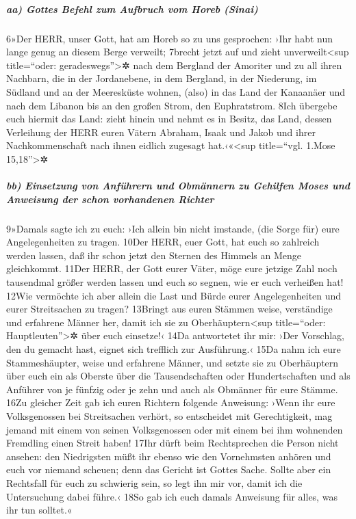 \hypertarget{aa-gottes-befehl-zum-aufbruch-vom-horeb-sinai}{%
\subparagraph{aa) Gottes Befehl zum Aufbruch vom Horeb
(Sinai)}\label{aa-gottes-befehl-zum-aufbruch-vom-horeb-sinai}}

6»Der HERR, unser Gott, hat am Horeb so zu uns gesprochen: ›Ihr habt nun
lange genug an diesem Berge verweilt; 7brecht jetzt auf und zieht
unverweilt\textless sup title=``oder: geradeswegs''\textgreater✲ nach
dem Bergland der Amoriter und zu all ihren Nachbarn, die in der
Jordanebene, in dem Bergland, in der Niederung, im Südland und an der
Meeresküste wohnen, (also) in das Land der Kanaanäer und nach dem
Libanon bis an den großen Strom, den Euphratstrom. 8Ich übergebe euch
hiermit das Land: zieht hinein und nehmt es in Besitz, das Land, dessen
Verleihung der HERR euren Vätern Abraham, Isaak und Jakob und ihrer
Nachkommenschaft nach ihnen eidlich zugesagt hat.‹«\textless sup
title=``vgl. 1.Mose 15,18''\textgreater✲

\hypertarget{bb-einsetzung-von-anfuxfchrern-und-obmuxe4nnern-zu-gehilfen-moses-und-anweisung-der-schon-vorhandenen-richter}{%
\subparagraph{bb) Einsetzung von Anführern und Obmännern zu Gehilfen
Moses und Anweisung der schon vorhandenen
Richter}\label{bb-einsetzung-von-anfuxfchrern-und-obmuxe4nnern-zu-gehilfen-moses-und-anweisung-der-schon-vorhandenen-richter}}

9»Damals sagte ich zu euch: ›Ich allein bin nicht imstande, (die Sorge
für) eure Angelegenheiten zu tragen. 10Der HERR, euer Gott, hat euch so
zahlreich werden lassen, daß ihr schon jetzt den Sternen des Himmels an
Menge gleichkommt. 11Der HERR, der Gott eurer Väter, möge eure jetzige
Zahl noch tausendmal größer werden lassen und euch so segnen, wie er
euch verheißen hat! 12Wie vermöchte ich aber allein die Last und Bürde
eurer Angelegenheiten und eurer Streitsachen zu tragen? 13Bringt aus
euren Stämmen weise, verständige und erfahrene Männer her, damit ich sie
zu Oberhäuptern\textless sup title=``oder: Hauptleuten''\textgreater✲
über euch einsetze!‹ 14Da antwortetet ihr mir: ›Der Vorschlag, den du
gemacht hast, eignet sich trefflich zur Ausführung.‹ 15Da nahm ich eure
Stammeshäupter, weise und erfahrene Männer, und setzte sie zu
Oberhäuptern über euch ein als Oberste über die Tausendschaften oder
Hundertschaften und als Anführer von je fünfzig oder je zehn und auch
als Obmänner für eure Stämme. 16Zu gleicher Zeit gab ich euren Richtern
folgende Anweisung: ›Wenn ihr eure Volksgenossen bei Streitsachen
verhört, so entscheidet mit Gerechtigkeit, mag jemand mit einem von
seinen Volksgenossen oder mit einem bei ihm wohnenden Fremdling einen
Streit haben! 17Ihr dürft beim Rechtsprechen die Person nicht ansehen:
den Niedrigsten müßt ihr ebenso wie den Vornehmsten anhören und euch vor
niemand scheuen; denn das Gericht ist Gottes Sache. Sollte aber ein
Rechtsfall für euch zu schwierig sein, so legt ihn mir vor, damit ich
die Untersuchung dabei führe.‹ 18So gab ich euch damals Anweisung für
alles, was ihr tun solltet.«


